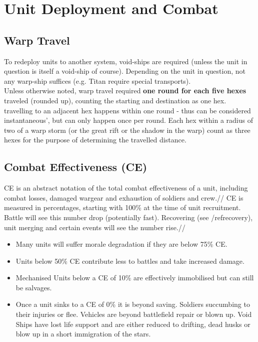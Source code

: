 
 \section{Unit Deployment and Combat}
 \subsection{Warp Travel}\label{warp_travel}
 To redeploy units to another system, void-ships are required (unless the unit in question is itself a void-ship of course). Depending on the unit in question, not any warp-ship suffices (e.g. Titan require special transports).\\
 Unless otherwise noted, warp travel required \textbf{one round for each five hexes} traveled (rounded up), counting the starting and destination as one hex. travelling to an adjacent hex happens within one round - thus can be considered instantaneous', but can only happen once per round. Each hex within a radius of two of a warp storm (or the great rift or the shadow in the warp) count as three hexes for the purpose of determining the travelled distance.
 

 \subsection{Combat Effectiveness (CE)}
 CE is an abstract notation of the total combat effectiveness of a unit, including combat losses, damaged wargear and exhaustion of soldiers and crew.// 
CE is measured in percentages, starting with 100\% at the time of unit recruitment. Battle will see this number drop (potentially fast). Recovering (see /ref{recovery}), unit merging and certain events will see the number rise.// 
\begin{itemize}
\item Many units will suffer morale degradation if they are below 75\% CE.
\item Units below 50\% CE contribute less to battles and take increased damage. 
\item Mechanised Units below a CE of 10\% are effectively immobilised but can still be salvages. 
\item Once a unit sinks to a CE of 0\% it is beyond saving. Soldiers succumbing to their injuries or flee. Vehicles are beyond battlefield repair or blown up. Void Ships have lost life support and are either reduced to drifting, dead husks or blow up in a short immigration of the stars. 
\end{itemize}


